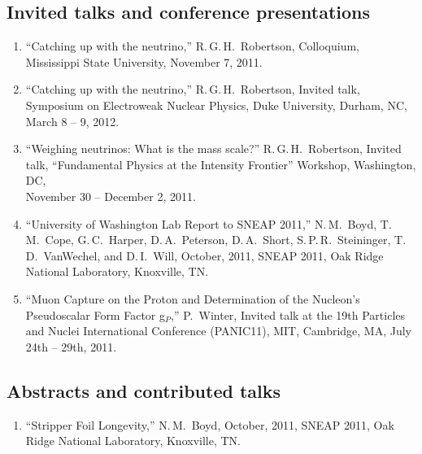 %
%
%
\subsection{Invited talks and conference presentations}
%
%
%

\begin{enumerate} %

\item ``Catching up with the neutrino,''  R.\,G.\,H.~Robertson\leadauthor, Colloquium, Mississippi State University, November 7, 2011.\DOEsupport

\item ``Catching up with the neutrino,'' R.\,G.\,H.~Robertson, Invited talk, Symposium on Electroweak Nuclear Physics, Duke University, Durham, NC, March 8 -- 9, 2012.

\item ``Weighing neutrinos: What is the mass scale?''  R.\,G.\,H.~Robertson, Invited talk, ``Fundamental Physics at the Intensity Frontier'' Workshop, Washington, DC, \\ November 30 -- December 2, 2011.

\item ``University of Washington Lab Report to SNEAP 2011,'' N.\,M.~Boyd\leadauthor, T.\,M.~Cope, G.\,C.~Harper, D.\,A.~Peterson, D.\,A.~Short, S.\,P.\,R.~Steininger, T.\,D.~VanWechel, and D.\,I.~Will, October, 2011, SNEAP 2011, Oak Ridge National Laboratory, Knoxville, TN.\DOEsupport 

\item ``Muon Capture on the Proton and Determination of the Nucleon's Pseudoscalar Form Factor g$_P$,'' P.~Winter\leadauthor, Invited talk at the 19th Particles and Nuclei International Conference (PANIC11),  MIT, Cambridge, MA, July 24th -- 29th, 2011.

\end{enumerate} %

\newpage
\let\thefootnote\relax{}
\let\thefootnote\relax{}

%
%  
%
\subsection{Abstracts and contributed talks}
%
%  
%
\begin{enumerate} %

\item ``Stripper Foil Longevity,'' N.\,M.~Boyd\leadauthor, October, 2011, SNEAP 2011, Oak Ridge National Laboratory, Knoxville, TN.\DOEsupport

\end{enumerate} %

